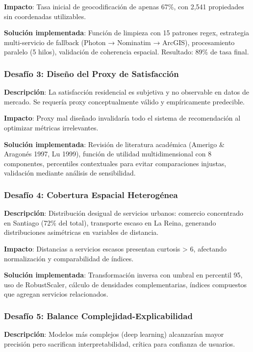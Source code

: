 \textbf{Impacto}: Tasa inicial de geocodificación de apenas 67\%, con 2,541 propiedades sin coordenadas utilizables.

\textbf{Solución implementada}: Función de limpieza con 15 patrones regex, estrategia multi-servicio de fallback (Photon → Nominatim → ArcGIS), procesamiento paralelo (5 hilos), validación de coherencia espacial. Resultado: 89\% de tasa final.

\subsubsection{Desafío 3: Diseño del Proxy de Satisfacción}

\textbf{Descripción}: La satisfacción residencial es subjetiva y no observable en datos de mercado. Se requería proxy conceptualmente válido y empíricamente predecible.

\textbf{Impacto}: Proxy mal diseñado invalidaría todo el sistema de recomendación al optimizar métricas irrelevantes.

\textbf{Solución implementada}: Revisión de literatura académica (Amerigo \& Aragonés 1997, Lu 1999), función de utilidad multidimensional con 8 componentes, percentiles contextuales para evitar comparaciones injustas, validación mediante análisis de sensibilidad.

\subsubsection{Desafío 4: Cobertura Espacial Heterogénea}

\textbf{Descripción}: Distribución desigual de servicios urbanos: comercio concentrado en Santiago (72\% del total), transporte escaso en La Reina, generando distribuciones asimétricas en variables de distancia.

\textbf{Impacto}: Distancias a servicios escasos presentan curtosis > 6, afectando normalización y comparabilidad de índices.

\textbf{Solución implementada}: Transformación inversa con umbral en percentil 95, uso de RobustScaler, cálculo de densidades complementarias, índices compuestos que agregan servicios relacionados.

\subsubsection{Desafío 5: Balance Complejidad-Explicabilidad}

\textbf{Descripción}: Modelos más complejos (deep learning) alcanzarían mayor precisión pero sacrifican interpretabilidad, crítica para confianza de usuarios.

